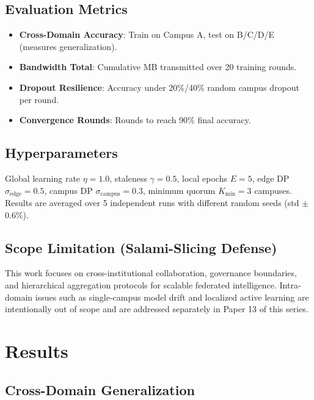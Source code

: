 \documentclass[conference]{IEEEtran}
\begin{document}
\subsection{Evaluation Metrics}

\begin{itemize}
    \item \textbf{Cross-Domain Accuracy}: Train on Campus A, test on B/C/D/E (measures generalization).
    \item \textbf{Bandwidth Total}: Cumulative MB transmitted over 20 training rounds.
    \item \textbf{Dropout Resilience}: Accuracy under 20\%/40\% random campus dropout per round.
    \item \textbf{Convergence Rounds}: Rounds to reach 90\% final accuracy.
\end{itemize}

\subsection{Hyperparameters}

Global learning rate $\eta = 1.0$, staleness $\gamma = 0.5$, local epochs $E = 5$, edge DP $\sigma_{\text{edge}} = 0.5$, campus DP $\sigma_{\text{campus}} = 0.3$, minimum quorum $K_{\min} = 3$ campuses. Results are averaged over 5 independent runs with different random seeds (std $\pm$0.6\%).

\subsection{Scope Limitation (Salami-Slicing Defense)}
This work focuses on cross-institutional collaboration, governance boundaries, and hierarchical aggregation protocols for scalable federated intelligence. Intra-domain issues such as single-campus model drift and localized active learning are intentionally out of scope and are addressed separately in Paper 13 of this series.

\section{Results}

\subsection{Cross-Domain Generalization}
\end{document}
